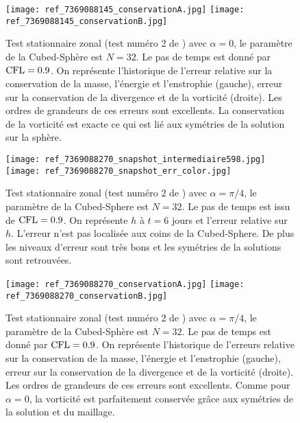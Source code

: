 \begin{figure}[htbp]
\begin{center}
\texttt{[image: ref\_7369088145\_conservationA.jpg]}
\texttt{[image: ref\_7369088145\_conservationB.jpg]}
\end{center}
\caption{Test stationnaire zonal (test numéro 2 de \cite{Williamson1992}) avec $\alpha=0$, le paramètre de la Cubed-Sphère est $N=32$. Le pas de temps est donné par $\text{CFL}=0.9$. On représente l'historique de l'erreur relative sur la conservation de la masse, l'énergie et l'enstrophie (gauche), erreur sur la conservation de la divergence et de la vorticité (droite). Les ordres de grandeurs de ces erreurs sont excellents. La conservation de la vorticité est exacte ce qui est lié aux symétries de la solution sur la sphère.}
\label{fig: williamson 2 conservation alpha=0}
\end{figure}

\begin{figure}[htbp]
\begin{center}
\texttt{[image: ref\_7369088270\_snapshot\_intermediaire598.jpg]}\\
\texttt{[image: ref\_7369088270\_snapshot\_err\_color.jpg]}
\end{center}
\caption{Test stationnaire zonal (test numéro 2 de \cite{Williamson1992}) avec $\alpha=\pi/4$, le paramètre de la Cubed-Sphere est $N=32$. Le pas de temps est issu de $\text{CFL}=0.9$. On représente $h$ à $t=6$ jours et l'erreur relative sur $h$. L'erreur n'est pas localisée aux coins de la Cubed-Sphere. De plus les niveaux d'erreur sont très bons et les symétries de la solutions sont retrouvées.}
\label{fig: williamson 2 space alpha=pi/4}
\end{figure}

\begin{figure}[htbp]
\begin{center}
\texttt{[image: ref\_7369088270\_conservationA.jpg]}
\texttt{[image: ref\_7369088270\_conservationB.jpg]}
\end{center}
\caption{Test stationnaire zonal (test numéro 2 de \cite{Williamson1992}) avec $\alpha=\pi/4$, le paramètre de la Cubed-Sphère est $N=32$. Le pas de temps est donné par $\text{CFL}=0.9$. On représente l'historique de l'erreurs relative sur la conservation de la masse, l'énergie et l'enstrophie (gauche), erreur sur la conservation de la divergence et de la vorticité (droite). Les ordres de grandeurs de ces erreurs sont excellents. Comme pour $\alpha = 0$, la vorticité est parfaitement conservée grâce aux symétries de la solution et du maillage.}
\label{fig: williamson 2 conservation alpha=pi/4}
\end{figure}

